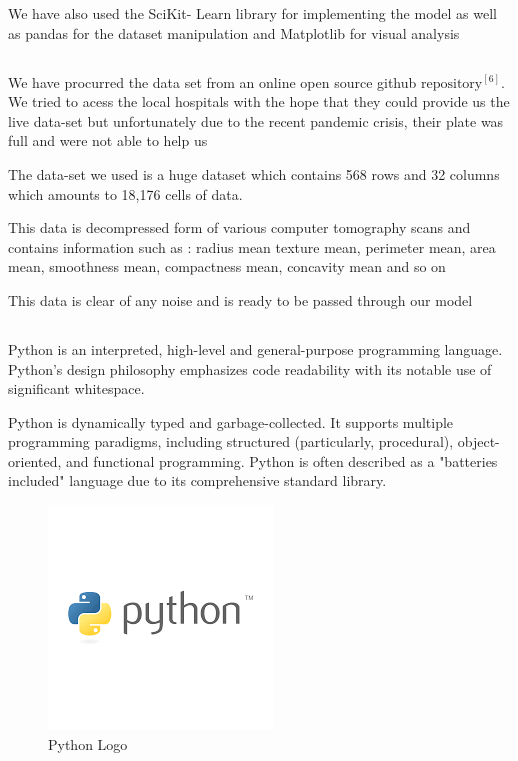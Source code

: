 \documentclass[12pt]{article}
\newcommand{\msize}{\fontsize{14pt}{12pt}\selectfont}
\begin{document}
We have also used the SciKit- Learn library for implementing the model as well as pandas for the dataset manipulation and Matplotlib for visual analysis 
\subsection{\msize{\textbf{THE DATA-SET}}}
We have procurred the data set from an online open source github $\text{repository}^{[6]}$. We tried to acess the local hospitals with the hope that they could provide us the live data-set but unfortunately due to the recent pandemic crisis, their plate was full and were not able to help us 

The data-set we used is a huge dataset which contains 568 rows and 32 columns which amounts to 18,176 cells of data. 

This data is decompressed form of various computer tomography scans and contains information such as : radius mean	texture mean, perimeter mean, area mean, smoothness mean, compactness mean, concavity mean and so on 


This data is clear of any noise and is ready to be passed through our model 
\newpage
\subsection{\msize{\textbf{PYTHON}}}
Python is an interpreted, high-level and general-purpose programming language. Python's design philosophy emphasizes code readability with its notable use of significant whitespace.

Python is dynamically typed and garbage-collected. It supports multiple programming paradigms, including structured (particularly, procedural), object-oriented, and functional programming. Python is often described as a "batteries included" language due to its comprehensive standard library.

\begin{center}
\begin{figure}[h]
\centerline{\includegraphics[scale=.7]{IMG_8208.png}}
\caption{Python Logo}
\end{figure}
\end{center}
\end{document}

